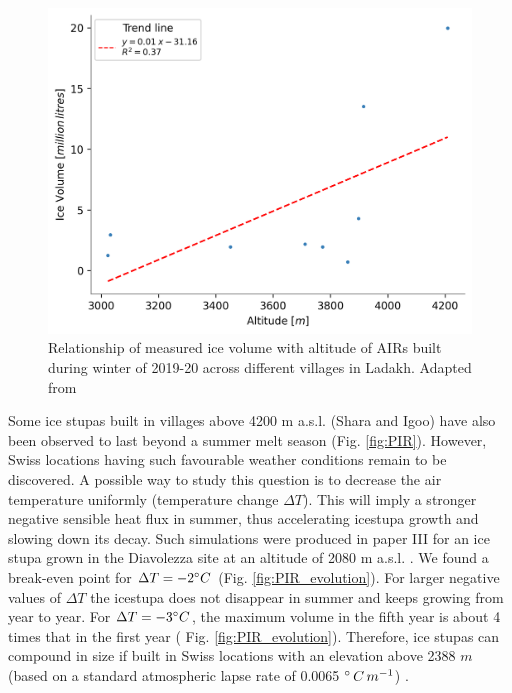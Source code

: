 \begin{figure}[htb]
\centering
\includegraphics[width=\textwidth]{figs/altitudevsvolume.png}
\caption{Relationship of measured ice volume with altitude of AIRs built during winter of 2019-20 across
different villages in Ladakh. Adapted from \citep{mariagruberIceStupasLadakh2022}}
\label{fig:altvsvol}
\end{figure}

Some ice stupas built in villages above 4200 m a.s.l. (Shara and Igoo) have also been observed to last beyond a
summer melt season (Fig. \ref{fig:PIR}). However, Swiss locations having such favourable weather conditions
remain to be discovered. A possible way to study this question is to decrease the air temperature uniformly
(temperature change $\Delta T$). This will imply a stronger negative sensible heat flux in summer, thus
accelerating icestupa growth and slowing down its decay. Such simulations were produced in paper III for an ice
stupa grown in the Diavolezza site at an altitude of 2080 m a.s.l. . We found a break-even point for $\Delta T = -2 ^{\circ}
C$ (Fig. \ref{fig:PIR_evolution}). For larger negative values of $\Delta T$ the icestupa does not disappear in
summer and keeps growing from year to year. For $\Delta T = -3 ^{\circ} C$, the maximum volume in the fifth year
is about 4 times that in the first year (  Fig. \ref{fig:PIR_evolution}). Therefore, ice stupas can compound in size if
built in Swiss locations with an elevation above 2388 $m$ (based on a standard atmospheric lapse rate of 0.0065
$^{\circ}\,C\,m^{-1}$) .

